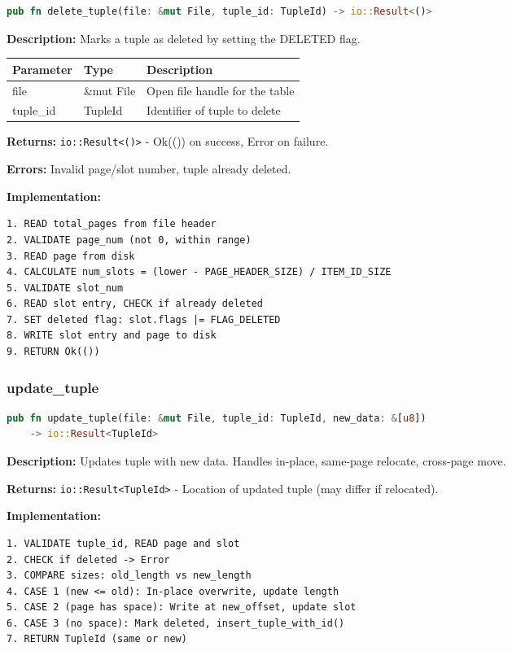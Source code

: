 \documentclass[11pt,a4paper]{article}
\begin{document}
\begin{lstlisting}[language=Rust]
pub fn delete_tuple(file: &mut File, tuple_id: TupleId) -> io::Result<()>
\end{lstlisting}

\textbf{Description:} Marks a tuple as deleted by setting the DELETED flag.

\begin{table}[H]
\centering
\begin{tabular}{@{}lll@{}}
\toprule
\textbf{Parameter} & \textbf{Type} & \textbf{Description} \\
\midrule
file & \&mut File & Open file handle for the table \\
tuple\_id & TupleId & Identifier of tuple to delete \\
\bottomrule
\end{tabular}
\end{table}

\textbf{Returns:} \texttt{io::Result<()>} - Ok(()) on success, Error on failure.

\textbf{Errors:} Invalid page/slot number, tuple already deleted.

\textbf{Implementation:}
\begin{lstlisting}
1. READ total_pages from file header
2. VALIDATE page_num (not 0, within range)
3. READ page from disk
4. CALCULATE num_slots = (lower - PAGE_HEADER_SIZE) / ITEM_ID_SIZE
5. VALIDATE slot_num
6. READ slot entry, CHECK if already deleted
7. SET deleted flag: slot.flags |= FLAG_DELETED
8. WRITE slot entry and page to disk
9. RETURN Ok(())
\end{lstlisting}

\subsubsection{update\_tuple}

\begin{lstlisting}[language=Rust]
pub fn update_tuple(file: &mut File, tuple_id: TupleId, new_data: &[u8])
    -> io::Result<TupleId>
\end{lstlisting}

\textbf{Description:} Updates tuple with new data. Handles in-place, same-page relocate, cross-page move.

\textbf{Returns:} \texttt{io::Result<TupleId>} - Location of updated tuple (may differ if relocated).

\textbf{Implementation:}
\begin{lstlisting}
1. VALIDATE tuple_id, READ page and slot
2. CHECK if deleted -> Error
3. COMPARE sizes: old_length vs new_length
4. CASE 1 (new <= old): In-place overwrite, update length
5. CASE 2 (page has space): Write at new_offset, update slot
6. CASE 3 (no space): Mark deleted, insert_tuple_with_id()
7. RETURN TupleId (same or new)
\end{lstlisting}
\end{document}
